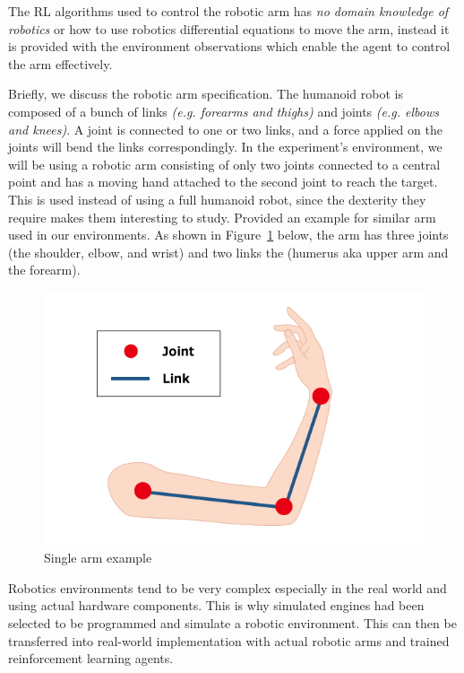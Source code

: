 The RL algorithms used to control the robotic arm has \textit{no domain knowledge of robotics} or how to use robotics differential equations to move the arm, instead it is provided with the environment observations which enable the agent to control the arm effectively. 

Briefly, we discuss the robotic arm specification. The humanoid robot is composed of a bunch of links \textit{(e.g. forearms and thighs)} and joints \textit{ (e.g. elbows and knees)}. A joint is connected to one or two links, and a force applied on the joints will bend the links correspondingly. In the experiment's environment, we will be using a robotic arm consisting of only two joints connected to a central point and has a moving hand attached to the second joint to reach the target. This is used instead of using a full humanoid robot, since the dexterity they require makes them interesting to study. Provided an example for similar arm used in our environments. As shown in Figure~\ref{fig:arm} below, the arm has three joints (the shoulder, elbow, and wrist) and two links the (humerus aka upper arm and the forearm).

\begin{figure}[!htb]
	\centering
	\includegraphics[width=\linewidth]{figures/arm.png}
	\caption{Single arm example}
	\label{fig:arm}
\end{figure}

Robotics environments tend to be very complex especially in the real world and using actual hardware components. This is why simulated engines had been selected to be programmed and simulate a robotic environment. This can then be transferred into real-world implementation with actual robotic arms and trained reinforcement learning agents. 

